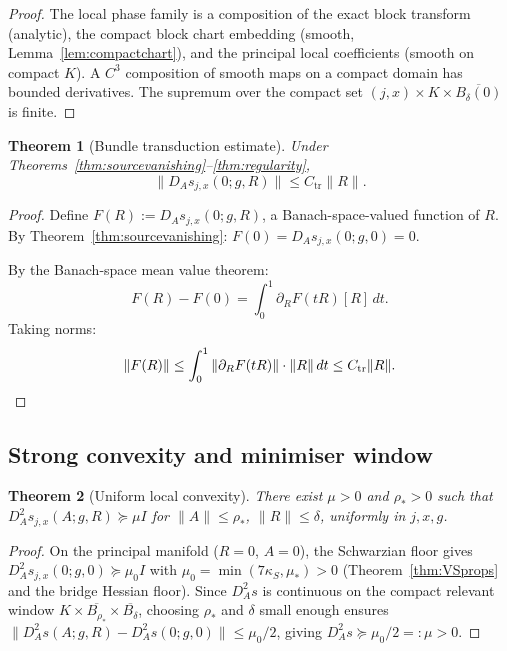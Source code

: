 \documentclass[12pt]{article}
\theoremstyle{plain}
\newtheorem{theorem}{Theorem}[section]
\theoremstyle{definition}
\numberwithin{equation}{section}
\newcommand{\tr}{\mathrm{tr}}
\begin{document}
\begin{proof}
The local phase family is a composition of the exact block transform (analytic), the compact block chart embedding (smooth, Lemma~\ref{lem:compactchart}), and the principal local coefficients (smooth on compact $K$).  A $C^3$ composition of smooth maps on a compact domain has bounded derivatives.  The supremum over the compact set $(j,x)\times K\times\overline{B_\delta(0)}$ is finite.
\end{proof}

\begin{theorem}[Bundle transduction estimate]\label{thm:transduction}
Under Theorems~\ref{thm:sourcevanishing}--\ref{thm:regularity},
\begin{equation}
\boxed{\|D_A s_{j,x}(0;g,R)\| \leq C_{\tr}\|R\|.}
\end{equation}
\end{theorem}

\begin{proof}
Define $F(R):=D_A s_{j,x}(0;g,R)$, a Banach-space-valued function of $R$.  By Theorem~\ref{thm:sourcevanishing}: $F(0)=D_A s_{j,x}(0;g,0)=0$.

By the Banach-space mean value theorem:
\begin{equation}
F(R)-F(0) = \int_0^1\partial_{R}F(tR)[R]\,dt.
\end{equation}
Taking norms:
\begin{equation}
\|F(R)\| \leq \int_0^1\|\partial_{R}F(tR)\|\cdot\|R\|\,dt \leq C_{\tr}\|R\|.\qedhere
\end{equation}
\end{proof}

\subsection{Strong convexity and minimiser window}

\begin{theorem}[Uniform local convexity]\label{thm:convexity}
There exist $\mu>0$ and $\rho_*>0$ such that $D_A^2 s_{j,x}(A;g,R)\succeq\mu I$ for $\|A\|\leq\rho_*$, $\|R\|\leq\delta$, uniformly in $j,x,g$.
\end{theorem}

\begin{proof}
On the principal manifold ($R=0$, $A=0$), the Schwarzian floor gives $D_A^2 s_{j,x}(0;g,0)\succeq\mu_0 I$ with $\mu_0=\min(7\kappa_S,\mu_*)>0$ (Theorem~\ref{thm:VSprops} and the bridge Hessian floor).  Since $D_A^2 s$ is continuous on the compact relevant window $K\times\overline{B_{\rho_*}}\times\overline{B_\delta}$, choosing $\rho_*$ and $\delta$ small enough ensures $\|D_A^2 s(A;g,R)-D_A^2 s(0;g,0)\|\leq\mu_0/2$, giving $D_A^2 s\succeq\mu_0/2=:\mu>0$.
\end{proof}
\end{document}
